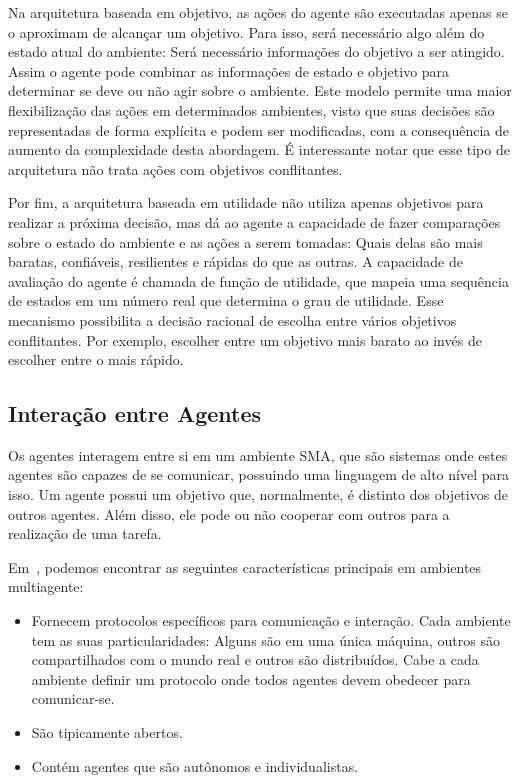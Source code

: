Na arquitetura baseada em objetivo, as ações do agente são executadas apenas se o aproximam de alcançar um objetivo. Para isso, será necessário algo além do estado atual do ambiente: Será necessário informações do objetivo a ser atingido. Assim o agente pode combinar as informações de estado e objetivo para determinar se deve ou não agir sobre o ambiente. Este modelo permite uma maior flexibilização das ações em determinados ambientes, visto que suas decisões são representadas de forma explícita e podem ser modificadas, com a consequência de aumento da complexidade desta abordagem. É interessante notar que esse tipo de arquitetura não trata ações com objetivos conflitantes.

Por fim, a arquitetura baseada em utilidade não utiliza apenas objetivos para realizar a próxima decisão, mas dá ao agente a capacidade de fazer comparações sobre o estado do ambiente e as ações a serem tomadas: Quais delas são mais baratas, confiáveis, resilientes e rápidas do que as outras. A capacidade de avaliação do agente é chamada de função de utilidade, que mapeia uma sequência de estados em um número real que determina o grau de utilidade. Esse mecanismo possibilita a decisão racional de escolha entre vários objetivos conflitantes. Por exemplo, escolher entre um objetivo mais barato ao invés de escolher entre o mais rápido.

\subsection{Interação entre Agentes}

Os agentes interagem entre si em um ambiente SMA, que são sistemas onde estes agentes são capazes de se comunicar, possuindo uma linguagem de alto nível para isso. Um agente possui um objetivo que, normalmente, é distinto dos objetivos de outros agentes. Além disso, ele pode ou não cooperar com outros para a realização de uma tarefa.

Em~\cite{sarmento11}, podemos encontrar as seguintes características principais em ambientes multiagente:
\begin{itemize}
	\item Fornecem protocolos específicos para comunicação e interação. Cada ambiente tem as suas particularidades: Alguns são em uma única máquina, outros são compartilhados com o mundo real e outros são distribuídos. Cabe a cada ambiente definir um protocolo onde todos agentes devem obedecer para comunicar-se.
	\item São tipicamente abertos.
	\item Contém agentes que são autônomos e individualistas.
\end{itemize}

